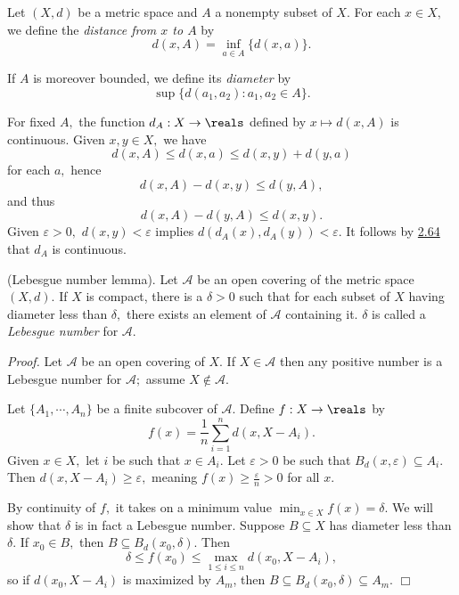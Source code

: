 \begin{definition}\label{3.38}
    Let $(X, d)$ be a metric space and $A$ a nonempty subset of $X.$ For each $x \in X,$ we define the {\it distance from $x$ to $A$} by
    $$d(x, A) = \inf_{a \in A} \{d(x, a)\}.$$

    If $A$ is moreover bounded, we define its {\it diameter} by
    $$\sup \{d(a_1, a_2): a_1, a_2 \in A\}.$$
\end{definition}
For fixed $A,$ the function $d_A: X \rightarrow \reals$ defined by $x \mapsto d(x, A)$ is continuous. Given $x, y \in X,$ we have
$$d(x, A) \leq d(x, a) \leq d(x, y) + d(y, a)$$
for each $a,$ hence
$$d(x, A) - d(x, y) \leq d(y, A),$$
and thus
$$d(x, A) - d(y, A) \leq d(x, y).$$
Given $\varepsilon > 0,$ $d(x, y) < \varepsilon$ implies $d(d_A(x), d_A(y)) < \varepsilon$. It follows by \hyperref[2.64]{2.64} that $d_A$ is continuous.

\begin{lemma}\label{3.39}
    (Lebesgue number lemma). Let $\mathcal{A}$ be an open covering of the metric space $(X, d).$ If $X$ is compact, there is a $\delta > 0$ such that for each subset of $X$ having diameter less than $\delta,$ there exists an element of $\mathcal{A}$ containing it. $\delta$ is called a {\it Lebesgue number} for $\mathcal{A}.$
\end{lemma}
{\it Proof.} Let $\mathcal{A}$ be an open covering of $X.$ If $X \in \mathcal{A}$ then any positive number is a Lebesgue number for $\mathcal{A};$ assume $X \notin \mathcal{A}.$

Let $\{A_1, \cdots, A_n\}$ be a finite subcover of $\mathcal{A}$. Define $f: X \rightarrow \reals$ by
$$f(x) = \frac1n \sum_{i=1}^n d(x, X-A_i).$$
Given $x \in X,$ let $i$ be such that $x \in A_i.$ Let $\varepsilon > 0$ be such that $B_d(x, \varepsilon) \subseteq A_i.$ Then $d(x, X-A_i) \geq \varepsilon,$ meaning $f(x) \geq \frac{\varepsilon}{n} > 0$ for all $x.$

By continuity of $f,$ it takes on a minimum value $\min_{x \in X}f(x) = \delta$. We will show that $\delta$ is in fact a Lebesgue number. Suppose $B \subseteq X$ has diameter less than $\delta$. If $x_0 \in B,$ then $B \subseteq B_d(x_0, \delta).$ Then
$$\delta \leq f(x_0) \leq \max_{1 \leq i \leq n} d(x_0, X-A_i),$$
so if $d(x_0, X-A_i)$ is maximized by $A_m$, then $B \subseteq B_d(x_0, \delta) \subseteq A_m.$ $\Box$


